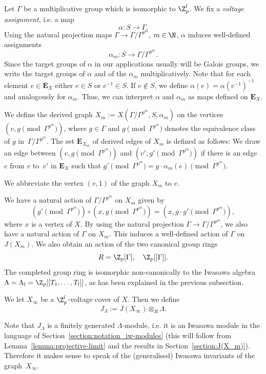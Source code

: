 Let $\Gamma$ be a multiplicative group which is isomorphic to $\Z_p^l$. We fix a \emph{voltage assignment}, i.e. a map  
\[\alpha \colon S\longrightarrow \Gamma.\]
Using the natural projection maps ${\Gamma\longrightarrow \Gamma/\Gamma^{p^m}}$, ${m \in \N}$, $\alpha$ induces well-defined assignments
\[\alpha_m\colon S\longrightarrow \Gamma/\Gamma^{p^m}.\]
Since the target groups of $\alpha$ in our applications usually will be Galois groups, we write the target groups of $\alpha$ and of the $\alpha_m$ multiplicatively. Note that for each element $e\in \mathbf{E}_X$ either $e\in S$ or $e^{-1}\in S$. If $e\notin S$, we define $\alpha(e)=\alpha(e^{-1})^{-1}$ and analogously for $\alpha_m$. Thus, we can interpret $\alpha$ and $\alpha_m$ as maps defined on $\mathbf{E}_X$. 
\begin{defi} \label{def:voltagelevel} 
	We define the derived graph ${X_m := X(\Gamma/\Gamma^{p^m},S,\alpha_m)}$ on the vertices $(v,g\!\!\pmod{\Gamma^{p^m}})$, where $g\in \Gamma$ and $g \!\!\pmod{\Gamma^{p^m}}$ denotes the equivalence class of $g$ in~$\Gamma/\Gamma^{p^m}$. The set $\mathbf{E}_{X_m}$ of derived edges of $X_m$ is defined as follows: We draw an edge between $(v , g\!\!\pmod{\Gamma^{p^m}})$ and $(v', g'\!\!\pmod{\Gamma^{p^m}})$ if there is an edge $e$ from $v$ to~$v'$ in $\mathbf{E}_X$ such that ${g'\pmod{\Gamma^{p^m}}=g \cdot \alpha_m(e) \pmod{\Gamma^{p^m}}}$. 
	
	We abbreviate the vertex $(v, 1)$ of the graph $X_m$ to $v$.  
\end{defi} 
We have a natural action of $\Gamma/\Gamma^{p^m}$ on $X_m$ given by
\[(g'\!\!\!\!\pmod{\Gamma^{p^m}}) \circ (x,g\!\!\!\!\pmod{\Gamma^{p^m}})=(x,g \cdot g'\!\!\!\!\pmod{\Gamma^{p^m}}),\] 
where $x$ is a vertex of $X$. 
By using the natural projection $\Gamma\longrightarrow \Gamma/\Gamma^{p^m}$, we also have a natural action of $\Gamma$ on $X_m$. This induces a well-defined action of $\Gamma$ on $J(X_m)$. We also obtain an action of the two canonical group rings 
\[ R = \Z_p[\Gamma], \quad \Z_p[[\Gamma]]. \] 
The completed group ring is isomorphic non-canonically to the Iwasawa algebra ${\Lambda = \Lambda_l = \Z_p[[T_1, \ldots, T_l]]}$, as has been explained in the previous subsection. 
\begin{defi} 
	We let $X_\infty$ be a $\Z_p^l$-voltage cover of $X$. Then we define 
	\[ J_\Lambda := J(X_\infty) \otimes_R \Lambda. \] 
\end{defi} 
Note that $J_\Lambda$ is a finitely generated $\Lambda$-module, i.e. it is an Iwasawa module in the language of Section~\ref{section:notation_iw-modules} (this will follow from Lemma~\ref{lemma:projective-limit} and the results in Section~\ref{section:J(X_m)}). Therefore it makes sense to speak of the (generalised) Iwasawa invariants of the graph~$X_\infty$. 

